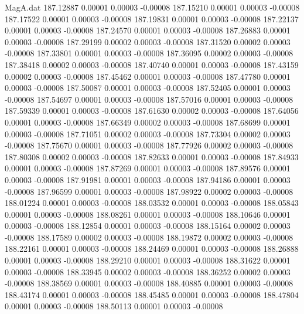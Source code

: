 \begin{filecontents}{MagA.dat}
 187.12887    0.00001    0.00003   -0.00008
 187.15210    0.00001    0.00003   -0.00008
 187.17522    0.00001    0.00003   -0.00008
 187.19831    0.00001    0.00003   -0.00008
 187.22137    0.00001    0.00003   -0.00008
 187.24570    0.00001    0.00003   -0.00008
 187.26883    0.00001    0.00003   -0.00008
 187.29199    0.00002    0.00003   -0.00008
 187.31520    0.00002    0.00003   -0.00008
 187.33801    0.00001    0.00003   -0.00008
 187.36095    0.00002    0.00003   -0.00008
 187.38418    0.00002    0.00003   -0.00008
 187.40740    0.00001    0.00003   -0.00008
 187.43159    0.00002    0.00003   -0.00008
 187.45462    0.00001    0.00003   -0.00008
 187.47780    0.00001    0.00003   -0.00008
 187.50087    0.00001    0.00003   -0.00008
 187.52405    0.00001    0.00003   -0.00008
 187.54697    0.00001    0.00003   -0.00008
 187.57016    0.00001    0.00003   -0.00008
 187.59339    0.00001    0.00003   -0.00008
 187.61630    0.00002    0.00003   -0.00008
 187.64056    0.00001    0.00003   -0.00008
 187.66349    0.00002    0.00003   -0.00008
 187.68699    0.00001    0.00003   -0.00008
 187.71051    0.00002    0.00003   -0.00008
 187.73304    0.00002    0.00003   -0.00008
 187.75670    0.00001    0.00003   -0.00008
 187.77926    0.00002    0.00003   -0.00008
 187.80308    0.00002    0.00003   -0.00008
 187.82633    0.00001    0.00003   -0.00008
 187.84933    0.00001    0.00003   -0.00008
 187.87269    0.00001    0.00003   -0.00008
 187.89576    0.00001    0.00003   -0.00008
 187.91981    0.00001    0.00003   -0.00008
 187.94186    0.00001    0.00003   -0.00008
 187.96599    0.00001    0.00003   -0.00008
 187.98922    0.00002    0.00003   -0.00008
 188.01224    0.00001    0.00003   -0.00008
 188.03532    0.00001    0.00003   -0.00008
 188.05843    0.00001    0.00003   -0.00008
 188.08261    0.00001    0.00003   -0.00008
 188.10646    0.00001    0.00003   -0.00008
 188.12854    0.00001    0.00003   -0.00008
 188.15164    0.00002    0.00003   -0.00008
 188.17589    0.00002    0.00003   -0.00008
 188.19872    0.00002    0.00003   -0.00008
 188.22161    0.00001    0.00003   -0.00008
 188.24469    0.00001    0.00003   -0.00008
 188.26888    0.00001    0.00003   -0.00008
 188.29210    0.00001    0.00003   -0.00008
 188.31622    0.00001    0.00003   -0.00008
 188.33945    0.00002    0.00003   -0.00008
 188.36252    0.00002    0.00003   -0.00008
 188.38569    0.00001    0.00003   -0.00008
 188.40885    0.00001    0.00003   -0.00008
 188.43174    0.00001    0.00003   -0.00008
 188.45485    0.00001    0.00003   -0.00008
 188.47804    0.00001    0.00003   -0.00008
 188.50113    0.00001    0.00003   -0.00008

\end{filecontents}
